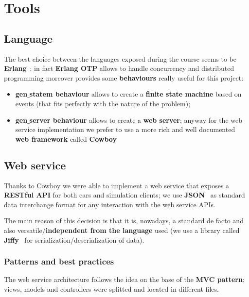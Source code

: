 \section{Tools}


\subsection{Language}


The best choice between the languages exposed during the course seems to be 
\textbf{Erlang}~\cite{3}; 
in fact \textbf{Erlang OTP} allows to handle concurrency and distributed programming
moreover provides some \textbf{behaviours} really useful for this project:
\begin{itemize}
    \item \textbf{gen$\_$statem behaviour} allows to create a \textbf{finite state machine} 
        based on events (that fits perfectly with the nature of the problem);
    \item \textbf{gen$\_$server behaviour} allows to create a \textbf{web server}; 
        anyway for the web service implementation we prefer to use a more 
        rich and well documented \textbf{web framework} called \textbf{Cowboy}~\cite{4}  
\end{itemize}


\subsection{Web service}

Thanks to Cowboy we were able to implement a web service that exposes a \textbf{RESTful API}  
for both cars and simulation clients; we use \textbf{JSON}~\cite{6} as standard data interchange 
format for any interaction with the web service APIs.

The main reason of this decision is that it is, nowadays, a standard de facto and also 
versatile/\textbf{independent from the language} used 
(we use a library called \textbf{Jiffy}~\cite{5} for serialization/deserialization of data).


\subsubsection{Patterns and best practices}

The web service architecture follows the idea on the base of the \textbf{MVC pattern}; 
views, models and controllers were splitted and located in different files. 

